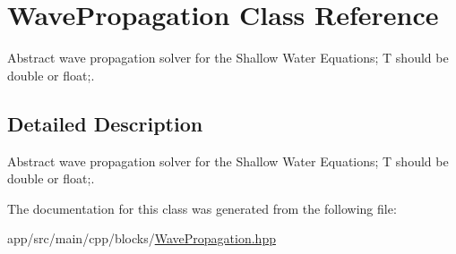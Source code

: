 \hypertarget{classWavePropagation}{}\section{Wave\+Propagation Class Reference}
\label{classWavePropagation}


Abstract wave propagation solver for the Shallow Water Equations; T should be double or float;.  




\subsection{Detailed Description}
Abstract wave propagation solver for the Shallow Water Equations; T should be double or float;. 

The documentation for this class was generated from the following file\+:\begin{DoxyCompactItemize}
\item 
app/src/main/cpp/blocks/\hyperlink{WavePropagation_8hpp}{Wave\+Propagation.\+hpp}\end{DoxyCompactItemize}
